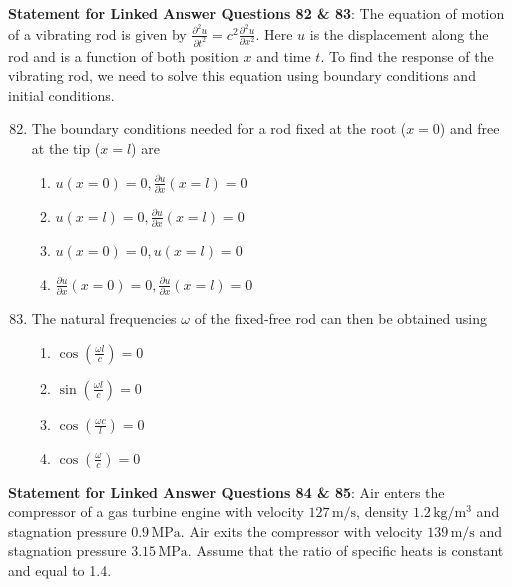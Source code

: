\documentclass{article}
\begin{document}
\textbf{Statement for Linked Answer Questions 82 \& 83}: The equation of motion of a vibrating rod is given by $\frac{\partial^2 u}{\partial t^2} = c^2 \frac{\partial^2 u}{\partial x^2}$. Here $u$ is the displacement along the rod and is a function of both position $x$ and time $t$. To find the response of the vibrating rod, we need to solve this equation using boundary conditions and initial conditions.

\begin{enumerate}
    \setcounter{enumi}{81}
    \item The boundary conditions needed for a rod fixed at the root ($x=0$) and free at the tip ($x=l$) are
    \begin{multicols}{2}
    \begin{enumerate}
        \item $u(x=0) = 0, \frac{\partial u}{\partial x}(x=l) = 0$
        \item $u(x=l) = 0, \frac{\partial u}{\partial x}(x=l) = 0$
        \item $u(x=0) = 0, u(x=l) = 0$
        \item $\frac{\partial u}{\partial x}(x=0) = 0, \frac{\partial u}{\partial x}(x=l) = 0$
    \end{enumerate}
    \end{multicols}
    

    \item The natural frequencies $\omega$ of the fixed-free rod can then be obtained using
    \begin{multicols}{4}
    \begin{enumerate}
        \item $\cos \left( \frac{\omega l}{c} \right) = 0$
        \item $\sin \left( \frac{\omega l}{c} \right) = 0$
        \item $\cos \left( \frac{\omega c}{l} \right) = 0$
        \item $\cos \left( \frac{\omega}{c} \right) = 0$
    \end{enumerate}
    \end{multicols}
    
\end{enumerate}

\textbf{Statement for Linked Answer Questions 84 \& 85}: Air enters the compressor of a gas turbine engine with velocity $127 \, \mathrm{m/s}$, density $1.2 \, \mathrm{kg/m^3}$ and stagnation pressure $0.9 \, \mathrm{MPa}$. Air exits the compressor with velocity $139 \, \mathrm{m/s}$ and stagnation pressure $3.15 \, \mathrm{MPa}$. Assume that the ratio of specific heats is constant and equal to 1.4.
\end{document}
